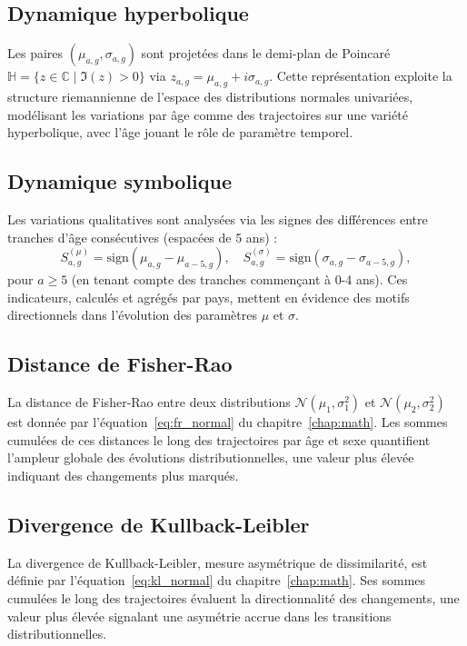 \subsection{Dynamique hyperbolique}

Les paires $(\mu_{a,g}, \sigma_{a,g})$ sont projetées dans le demi-plan de Poincaré $\mathbb{H} = \{ z \in \mathbb{C} \mid \Im(z) > 0 \}$ via $z_{a,g} = \mu_{a,g} + i \sigma_{a,g}$. Cette représentation exploite la structure riemannienne de l'espace des distributions normales univariées, modélisant les variations par âge comme des trajectoires sur une variété hyperbolique, avec l'âge jouant le rôle de paramètre temporel.

\subsection{Dynamique symbolique}

Les variations qualitatives sont analysées via les signes des différences entre tranches d'âge consécutives (espacées de 5 ans) :
 \begin{equation}
S_{a,g}^{(\mu)} = \mathrm{sign} (\mu_{a,g} - \mu_{a-5,g}), \quad S_{a,g}^{(\sigma)} = \mathrm{sign}(\sigma_{a,g} - \sigma_{a-5,g}),
 \end{equation}
pour $a \geq 5$ (en tenant compte des tranches commençant à 0-4 ans). Ces indicateurs, calculés et agrégés par pays, mettent en évidence des motifs directionnels dans l'évolution des paramètres $\mu$ et $\sigma$.

\subsection{Distance de Fisher-Rao}

La distance de Fisher-Rao entre deux distributions $\mathcal{N}(\mu_1, \sigma_1^2)$ et $\mathcal{N}(\mu_2, \sigma_2^2)$ est donnée par l'équation~\eqref{eq:fr_normal} du chapitre~\ref{chap:math}. Les sommes cumulées de ces distances le long des trajectoires par âge et sexe quantifient l'ampleur globale des évolutions distributionnelles, une valeur plus élevée indiquant des changements plus marqués.

\subsection{Divergence de Kullback-Leibler}

La divergence de Kullback-Leibler, mesure asymétrique de dissimilarité, est définie par l'équation~\eqref{eq:kl_normal} du chapitre~\ref{chap:math}. Ses sommes cumulées le long des trajectoires évaluent la directionnalité des changements, une valeur plus élevée signalant une asymétrie accrue dans les transitions distributionnelles.

